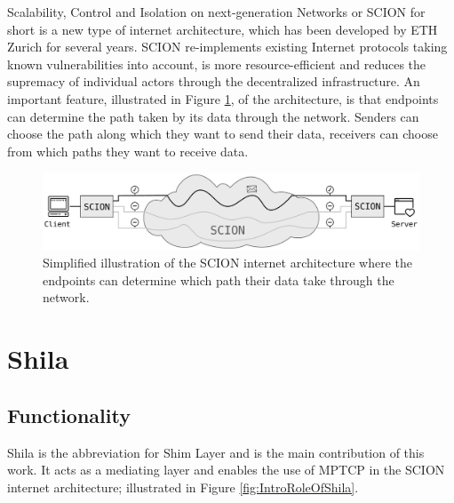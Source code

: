 Scalability, Control and Isolation on next-generation Networks or SCION for short is a new type of internet architecture, which has been developed by ETH Zurich for several years. SCION re-implements existing Internet protocols taking known vulnerabilities into account, is more resource-efficient and reduces the supremacy of individual actors through the decentralized infrastructure. An important feature, illustrated in Figure \ref{fig:IntroSCION}, of the architecture, is that endpoints can determine the path taken by its data through the network. Senders can choose the path along which they want to send their data, receivers can choose from which paths they want to receive data.
\begin{figure}[H]
	\begin{center}
		\def\svgwidth{1\textwidth}
		\includegraphics[scale=0.28]{../illustrations/introduction/SCION.pdf}
		\caption[Caption for the list of figures.]{Simplified illustration of the SCION internet architecture where the endpoints can determine which path their data take through the network.}
		\label{fig:IntroSCION}
	\end{center}
\end{figure}

\section{Shila}

\subsection*{Functionality}

Shila is the abbreviation for Shim Layer and is the main contribution of this work. It acts as a mediating layer and enables the use of MPTCP in the SCION internet architecture; illustrated in Figure \ref{fig:IntroRoleOfShila}. 

